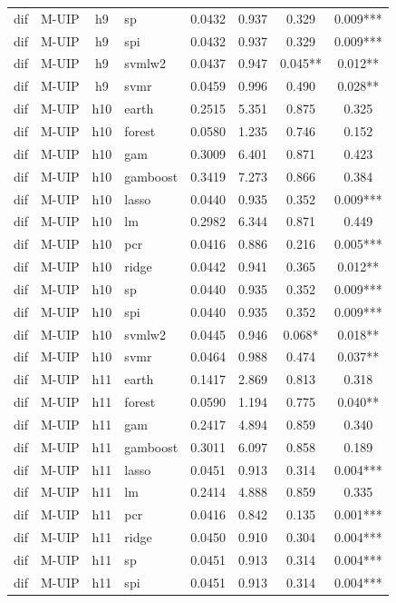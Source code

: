 \begin{ThreePartTable}
\begin{longtable}[t]{llclcccc}
dif & M-UIP & h9 & sp & 0.0432 & 0.937 & 0.329 & 0.009***\\
dif & M-UIP & h9 & spi & 0.0432 & 0.937 & 0.329 & 0.009***\\
dif & M-UIP & h9 & svmlw2 & 0.0437 & 0.947 & 0.045** & 0.012**\\
dif & M-UIP & h9 & svmr & 0.0459 & 0.996 & 0.490 & 0.028**\\
\addlinespace
dif & M-UIP & h10 & earth & 0.2515 & 5.351 & 0.875 & 0.325\\
dif & M-UIP & h10 & forest & 0.0580 & 1.235 & 0.746 & 0.152\\
dif & M-UIP & h10 & gam & 0.3009 & 6.401 & 0.871 & 0.423\\
dif & M-UIP & h10 & gamboost & 0.3419 & 7.273 & 0.866 & 0.384\\
dif & M-UIP & h10 & lasso & 0.0440 & 0.935 & 0.352 & 0.009***\\
dif & M-UIP & h10 & lm & 0.2982 & 6.344 & 0.871 & 0.449\\
dif & M-UIP & h10 & pcr & 0.0416 & 0.886 & 0.216 & 0.005***\\
dif & M-UIP & h10 & ridge & 0.0442 & 0.941 & 0.365 & 0.012**\\
dif & M-UIP & h10 & sp & 0.0440 & 0.935 & 0.352 & 0.009***\\
dif & M-UIP & h10 & spi & 0.0440 & 0.935 & 0.352 & 0.009***\\
dif & M-UIP & h10 & svmlw2 & 0.0445 & 0.946 & 0.068* & 0.018**\\
dif & M-UIP & h10 & svmr & 0.0464 & 0.988 & 0.474 & 0.037**\\
\addlinespace
dif & M-UIP & h11 & earth & 0.1417 & 2.869 & 0.813 & 0.318\\
dif & M-UIP & h11 & forest & 0.0590 & 1.194 & 0.775 & 0.040**\\
dif & M-UIP & h11 & gam & 0.2417 & 4.894 & 0.859 & 0.340\\
dif & M-UIP & h11 & gamboost & 0.3011 & 6.097 & 0.858 & 0.189\\
dif & M-UIP & h11 & lasso & 0.0451 & 0.913 & 0.314 & 0.004***\\
dif & M-UIP & h11 & lm & 0.2414 & 4.888 & 0.859 & 0.335\\
dif & M-UIP & h11 & pcr & 0.0416 & 0.842 & 0.135 & 0.001***\\
dif & M-UIP & h11 & ridge & 0.0450 & 0.910 & 0.304 & 0.004***\\
dif & M-UIP & h11 & sp & 0.0451 & 0.913 & 0.314 & 0.004***\\
dif & M-UIP & h11 & spi & 0.0451 & 0.913 & 0.314 & 0.004***\\

\end{longtable}
\end{ThreePartTable}
